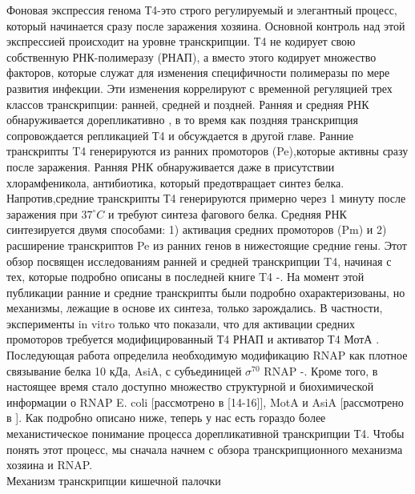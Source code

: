 \documentclass[a4paper,12pt]{article}
\begin{document}
    \par{
    Фоновая экспрессия генома Т4-это строго регулируемый и элегантный процесс, который начинается сразу после заражения
    хозяина. Основной контроль над этой экспрессией происходит на уровне транскрипции. Т4 не кодирует свою собственную
    РНК-полимеразу (РНАП), а вместо этого кодирует множество факторов, которые служат для изменения специфичности
    полимеразы по мере развития инфекции. Эти изменения коррелируют с временной регуляцией трех классов транскрипции:
    ранней, средней и поздней. Ранняя и средняя РНК обнаруживается дорепликативно
    \cite{hinton1,hinton2,hinton3,hinton4,hinton5,hinton6}, в то время как поздняя транскрипция сопровождается
    репликацией Т4 и обсуждается в другой главе. Ранние транскрипты T4 генерируются из ранних промоторов (Pe),которые
    активны сразу после заражения. Ранняя РНК обнаруживается даже в присутствии хлорамфеникола, антибиотика, который
    предотвращает синтез белка. Напротив,средние транскрипты Т4 генерируются примерно через 1 минуту после заражения при
    \(37^\circ C\)  и требуют синтеза фагового белка. Средняя РНК синтезируется двумя способами: 1) активация средних
    промоторов (Pm) и 2) расширение транскриптов Pe из ранних генов в нижестоящие средние гены. Этот обзор посвящен
    исследованиям ранней и средней транскрипции T4, начиная с тех, которые подробно описаны в последней книге T4
    \cite{hinton1}-\cite{hinton5}. На момент этой публикации ранние и средние транскрипты были подробно охарактеризованы,
    но механизмы, лежащие в основе их синтеза, только зарождались. В частности, эксперименты in vitro только что
    показали, что для активации средних промоторов требуется модифицированный Т4 РНАП и активатор Т4 МотА
    \cite{hinton7,hinton8}. Последующая работа определила необходимую модификацию RNAP как плотное связывание белка 10
    кДа, AsiA, с субъединицей \(\sigma^{70}\) RNAP \cite{hinton9}-\cite{hinton13}. Кроме того, в настоящее время стало
    доступно множество структурной и биохимической информации о RNAP E. coli [рассмотрено в [14-16]], MotA и AsiA
    [рассмотрено в \cite{hinton2}]. Как подробно описано ниже, теперь у нас есть гораздо более механистическое понимание
    процесса дорепликативной транскрипции Т4. Чтобы понять этот процесс, мы сначала начнем с обзора транскрипционного
    механизма хозяина и RNAP.} \\ 
    {\Large Механизм транскрипции кишечной палочки }
\end{document}

